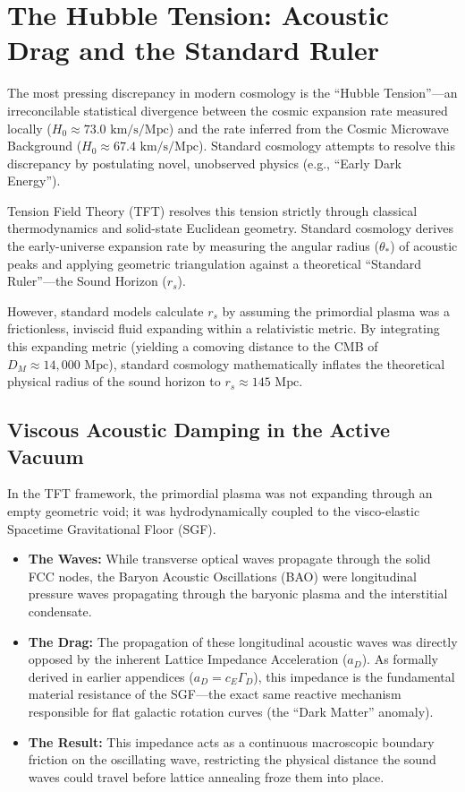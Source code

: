 \section{The Hubble Tension: Acoustic Drag and the Standard Ruler}
\label{sec:hubble_tension_acoustic_drag}

The most pressing discrepancy in modern cosmology is the ``Hubble Tension''---an irreconcilable statistical divergence between the cosmic expansion rate measured locally ($H_0 \approx 73.0 \text{ km/s/Mpc}$) and the rate inferred from the Cosmic Microwave Background ($H_0 \approx 67.4 \text{ km/s/Mpc}$). Standard cosmology attempts to resolve this discrepancy by postulating novel, unobserved physics (e.g., ``Early Dark Energy'').

Tension Field Theory (TFT) resolves this tension strictly through classical thermodynamics and solid-state Euclidean geometry. Standard cosmology derives the early-universe expansion rate by measuring the angular radius ($\theta_*$) of acoustic peaks and applying geometric triangulation against a theoretical ``Standard Ruler''---the Sound Horizon ($r_s$).

However, standard models calculate $r_s$ by assuming the primordial plasma was a frictionless, inviscid fluid expanding within a relativistic metric. By integrating this expanding metric (yielding a comoving distance to the CMB of $D_M \approx 14,000 \text{ Mpc}$), standard cosmology mathematically inflates the theoretical physical radius of the sound horizon to $r_s \approx 145 \text{ Mpc}$.

\subsection{Viscous Acoustic Damping in the Active Vacuum}
\label{sec:viscous_acoustic_damping}

In the TFT framework, the primordial plasma was not expanding through an empty geometric void; it was hydrodynamically coupled to the visco-elastic Spacetime Gravitational Floor (SGF).

\begin{itemize}
    \item \textbf{The Waves:} While transverse optical waves propagate through the solid FCC nodes, the Baryon Acoustic Oscillations (BAO) were longitudinal pressure waves propagating through the baryonic plasma and the interstitial condensate.
    \item \textbf{The Drag:} The propagation of these longitudinal acoustic waves was directly opposed by the inherent Lattice Impedance Acceleration ($a_D$). As formally derived in earlier appendices ($a_D = c_E \Gamma_D$), this impedance is the fundamental material resistance of the SGF---the exact same reactive mechanism responsible for flat galactic rotation curves (the ``Dark Matter'' anomaly).
    \item \textbf{The Result:} This impedance acts as a continuous macroscopic boundary friction on the oscillating wave, restricting the physical distance the sound waves could travel before lattice annealing froze them into place.
\end{itemize}

